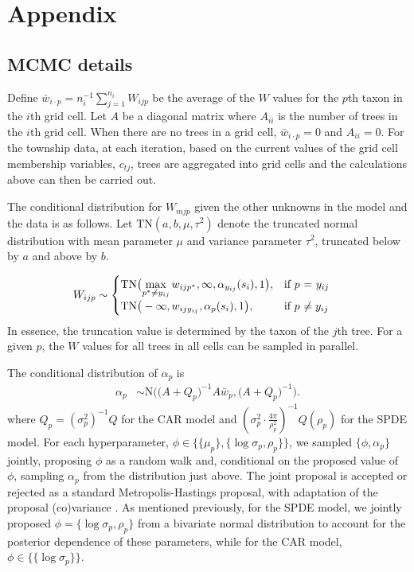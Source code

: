 \documentclass[12pt]{article}\usepackage[]{graphicx}\usepackage[]{color}
\begin{document}
\section{Appendix}


\subsection{MCMC details}

Define $\bar{w}_{i\cdot p}=n_{i}^{-1}{\displaystyle \sum_{j=1}^{n_{i}}W_{ijp}}$
be the average of the $W$ values for the $p$th taxon in the $i$th
grid cell. Let $A$ be a diagonal matrix where $A_{ii}$ is the number
of trees in the $i$th grid cell. When there are no trees in a grid
cell, $\bar{w}_{i\cdot p}=0$ and $A_{ii}=0$. For the township data,
at each iteration, based on the current values of the grid cell membership
variables, $c_{tj}$, trees are aggregated into grid cells and the
calculations above can then be carried out.

The conditional distribution for $W_{mjp}$ given the other unknowns
in the model and the data is as follows. Let $\mbox{TN}(a,b,\mu,\tau^{2})$
denote the truncated normal distribution with mean parameter $\mu$
and variance parameter $\tau^{2}$, truncated below by $a$ and above
by $b$. 

\begin{align}
W_{ijp} & \sim\begin{cases}
\mbox{TN}\big({\displaystyle \max_{p^{*}\neq y_{ij}}w_{ijp^{*}},\infty,\alpha_{y_{ij}}(s_{i}),1\big),} & \mbox{if }p\mbox{ = \ensuremath{y_{ij}}}\\
\mbox{TN}\big(-\infty,w_{ijy_{ij}},\alpha_{p}(s_{i}),1\big), & \mbox{if }p\mbox{ \ensuremath{\neq y_{ij}}}
\end{cases}\label{sampW}
\end{align}
In essence, the truncation value is determined by the taxon of the
$j$th tree. For a given $p$, the $W$ values for all trees in all
cells can be sampled in parallel. 

The conditional distribution of $\alpha_{p}$ is 
\begin{align}
\alpha_{p} & \sim\mbox{N}\bigg(\Big(A+Q_{p}\Big)^{-1}A\bar{w}_{p},\Big(A+Q_{p}\Big)^{-1}\bigg).\label{sampalpha}
\end{align}
where $Q_{p}=(\sigma_{p}^{2})^{-1}Q$ for the CAR model and $\left(\sigma_{p}^{2}\cdot\frac{4\pi}{\rho_{p}^{2}}\right)^{-1}Q(\rho_{p})$
for the SPDE model. For each hyperparameter, $\phi\in\{\{\mu_{p}\},\{\log\sigma_{p},\rho_{p}\}\}$,
we sampled $\{\phi,\alpha_{p}\}$ jointly, proposing $\phi$ as a
random walk and, conditional on the proposed value of $\phi$, sampling
$\alpha_{p}$ from the distribution just above. The joint proposal
is accepted or rejected as a standard Metropolis-Hastings proposal,
with adaptation of the proposal (co)variance \citep{Shab:Well:2011}.
As mentioned previously, for the SPDE model, we jointly proposed $\phi=\{\log\sigma_{p},\rho_{p}\}$
from a bivariate normal distribution to account for the posterior
dependence of these parameters, while for the CAR model, $\phi\in\{\{\log\sigma_{p}\}\}$. 
\end{document}
